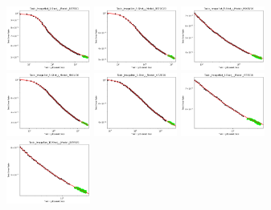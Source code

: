 \documentclass{article} %
\begin{document}
\begin{figure}
    \centering

\includegraphics[width=0.245\textwidth]{figures/scaling_laws_benchmark_dataset_plots/few_shot_5___BiT_50_1.png}
\includegraphics[width=0.245\textwidth]{figures/scaling_laws_benchmark_dataset_plots/few_shot_5___BiT_101_3.png}
\includegraphics[width=0.245\textwidth]{figures/scaling_laws_benchmark_dataset_plots/few_shot_5___MiX_B_16.png}
\includegraphics[width=0.245\textwidth]{figures/scaling_laws_benchmark_dataset_plots/few_shot_5___MiX_L_16.png}
\includegraphics[width=0.245\textwidth]{figures/scaling_laws_benchmark_dataset_plots/few_shot_5___ViT_B_16.png}
\includegraphics[width=0.245\textwidth]{figures/scaling_laws_benchmark_dataset_plots/few_shot_5___ViT_S_16.png}
\includegraphics[width=0.245\textwidth]{figures/scaling_laws_benchmark_dataset_plots/few_shot_10___BiT_50_1.png}

\end{figure}
\end{document}
